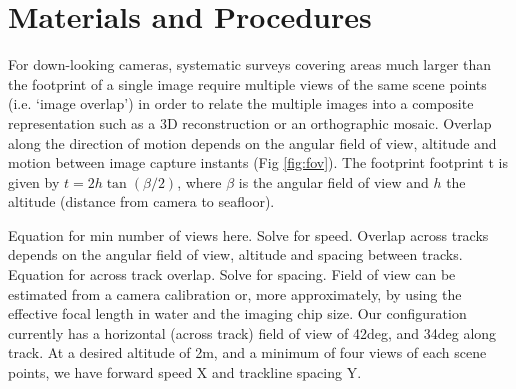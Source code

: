 \section{Materials and Procedures}


For down-looking cameras, systematic surveys covering areas much larger than the footprint of a single image require multiple views of the same scene points (i.e. `image overlap') in order to relate the multiple images into a composite representation such as a 3D reconstruction or an orthographic mosaic. Overlap along the direction of motion depends on the angular field of view, altitude and motion between image capture instants (Fig \ref{fig:fov}). The footprint footprint t is given by $t = 2 h \tan(\beta/2)$, where $\beta$ is the angular field of view and $h$ the altitude (distance from camera to seafloor).

Equation for min number of views here. Solve for speed.
Overlap across tracks depends on the angular field of view, altitude and spacing between tracks. 
Equation for across track overlap. Solve for spacing.
Field of view can be estimated from a camera calibration or, more approximately, by using the effective focal length in water and the imaging chip size. Our configuration currently has a horizontal (across track) field of view of 42deg, and 34deg along track. At a desired altitude of 2m, and a minimum of four views of each scene points, we have forward speed X and trackline spacing Y. 
